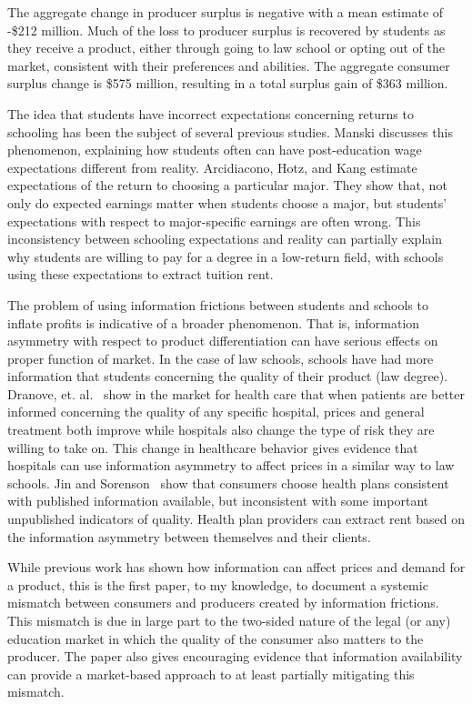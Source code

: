 \documentclass[12pt]{article}
\theoremstyle{definition}
\begin{document}
The aggregate change in producer surplus is negative with a mean estimate of -\$212 million. Much of the loss to producer surplus is recovered by students as they receive a product, either through going to law school or opting out of the market, consistent with their preferences and abilities. The aggregate consumer surplus change is \$575 million, resulting in a total surplus gain of \$363 million.

The idea that students have incorrect expectations concerning returns to schooling has been the subject of several previous studies. Manski \cite{Manski04} discusses this phenomenon, explaining how students often can have post-education wage expectations different from reality. Arcidiacono, Hotz, and Kang \cite{ArcHotzKang} estimate expectations of the return to choosing a particular major. They show that, not only do expected earnings matter when students choose a major, but students' expectations with respect to major-specific earnings are often wrong. This inconsistency between schooling expectations and reality can partially explain why students are willing to pay for a degree in a low-return field, with schools using these expectations to extract tuition rent.

The problem of using information frictions between students and schools to inflate profits is indicative of a broader phenomenon. That is, information asymmetry with respect to product differentiation can have serious effects on proper function of market. In the case of law schools, schools have had more information that students concerning the quality of their product (law degree). Dranove, et. al.~\cite{DranoveEtAl} show in the market for health care that when patients are better informed concerning the quality of any specific hospital, prices and general treatment both improve while hospitals also change the type of risk they are willing to take on. This change in healthcare behavior gives evidence that hospitals can use information asymmetry to affect prices in a similar way to law schools. Jin and Sorenson~\cite{JinSorenson} show that consumers choose health plans consistent with published information available, but inconsistent with some important unpublished indicators of quality. Health plan providers can extract rent based on the information asymmetry between themselves and their clients.

While previous work has shown how information can affect prices and demand for a product, this is the first paper, to my knowledge, to document a systemic mismatch between consumers and producers created by information frictions. This mismatch is due in large part to the two-sided nature of the legal (or any) education market in which the quality of the consumer also matters to the producer. The paper also gives encouraging evidence that information availability can provide a market-based approach to at least partially mitigating this mismatch.
\end{document}
